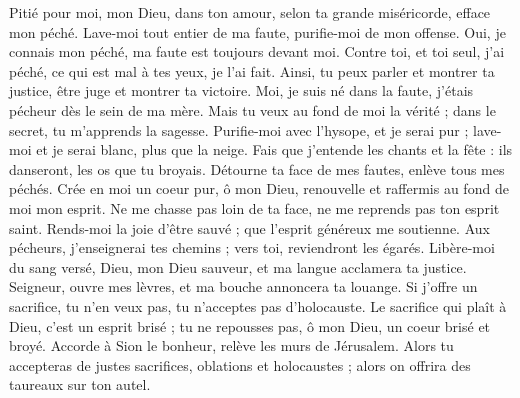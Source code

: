 Pitié pour moi, mon Dieu, dans ton amour, selon ta grande miséricorde, efface mon péché.
\versseparator
Lave-moi tout entier de ma faute, purifie-moi de mon offense.
\versseparator
Oui, je connais mon péché, ma faute est toujours devant moi.
\versseparator
Contre toi, et toi seul, j'ai péché, ce qui est mal à tes yeux, je l'ai fait. Ainsi, tu peux parler et montrer ta justice, être juge et montrer ta victoire.
\versseparator
Moi, je suis né dans la faute, j'étais pécheur dès le sein de ma mère.
\versseparator
Mais tu veux au fond de moi la vérité ; dans le secret, tu m'apprends la sagesse.
\versseparator
Purifie-moi avec l'hysope, et je serai pur ; lave-moi et je serai blanc, plus que la neige.
\versseparator
Fais que j'entende les chants et la fête : ils danseront, les os que tu broyais.
\versseparator
Détourne ta face de mes fautes, enlève tous mes péchés.
\versseparator
Crée en moi un coeur pur, ô mon Dieu, renouvelle et raffermis au fond de moi mon esprit.
\versseparator
Ne me chasse pas loin de ta face, ne me reprends pas ton esprit saint.
\versseparator
Rends-moi la joie d'être sauvé ; que l'esprit généreux me soutienne.
\versseparator
Aux pécheurs, j'enseignerai tes chemins ; vers toi, reviendront les égarés.
\versseparator
Libère-moi du sang versé, Dieu, mon Dieu sauveur, et ma langue acclamera ta justice.
\versseparator
Seigneur, ouvre mes lèvres, et ma bouche annoncera ta louange.
\versseparator
Si j'offre un sacrifice, tu n'en veux pas, tu n'acceptes pas d'holocauste.
\versseparator
Le sacrifice qui plaît à Dieu, c'est un esprit brisé ; tu ne repousses pas, ô mon Dieu, un coeur brisé et broyé.
\versseparator
Accorde à Sion le bonheur, relève les murs de Jérusalem.
\versseparator
Alors tu accepteras de justes sacrifices, oblations et holocaustes ; alors on offrira des taureaux sur ton autel.
